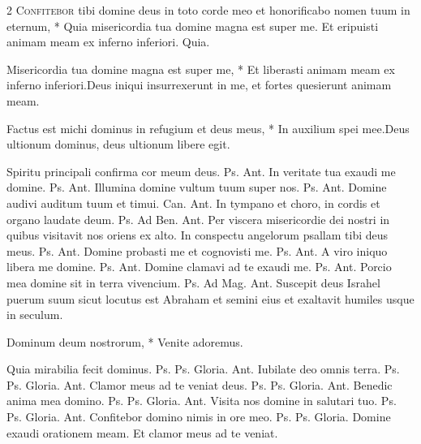 \begin{multicols*}{2}
\lettrine[lines=2]{\zallmancaps \color{Red} C}{onfitebor} \hypertarget{confitebor-tibi}{\label{confitebor-tibi}} tibi domine deus in toto corde meo et honorificabo nomen tuum in eternum, * Quia misericordia tua domine magna est super me. \V Et eripuisti animam meam ex inferno inferiori. Quia.
\begin{responsory}
{Misericordia tua domine magna est super me, * Et liberasti animam meam ex inferno inferiori.}{Deus iniqui insurrexerunt in me, et fortes quesierunt animam meam.}
\end{responsory}%
\begin{responsory-doxology}
{Factus est michi dominus in refugium et deus meus, * In auxilium spei mee.}{Deus ultionum dominus, deus ultionum libere egit.}
\end{responsory-doxology}%
 Spiritu principali confirma cor meum deus. {\color{Red} Ps.}  {\color{Red} Ant.} In veritate tua exaudi me domine. {\color{Red} Ps.}  {\color{Red} Ant.} Illumina domine vultum tuum super nos. {\color{Red} Ps.}  {\color{Red} Ant.} Domine audivi auditum tuum et timui. {\color{Red} Can.}  {\color{Red} Ant.} In tympano et choro, in cordis et organo laudate deum. {\color{Red} Ps.}  {\color{Red} Ad Ben. Ant.} Per viscera misericordie dei nostri in quibus visitavit nos oriens ex alto.
 In conspectu angelorum psallam tibi deus meus. {\color{Red} Ps.}  {\color{Red} Ant.} Domine probasti me et cognovisti me. {\color{Red} Ps.}  {\color{Red} Ant.} A viro iniquo libera me domine. {\color{Red} Ps.}  {\color{Red} Ant.} Domine clamavi ad te exaudi me. {\color{Red} Ps.}  {\color{Red} Ant.} Porcio mea domine sit in terra vivencium. {\color{Red} Ps.}  {\color{Red} Ad Mag. Ant.} Suscepit deus Israhel puerum suum sicut locutus est Abraham et semini eius et exaltavit humiles usque in seculum.
{\color{Red} }
\par {}
\begin{invitatory}
{Dominum deum nostrorum, * Venite adoremus.}
\end{invitatory}
 Quia mirabilia fecit dominus. {\color{Red} Ps.}  {\color{Red} Ps.}  Gloria. {\color{Red} Ant.} Iubilate deo omnis terra. {\color{Red} Ps.}  {\color{Red} Ps.}  Gloria. {\color{Red} Ant.} Clamor meus ad te veniat deus. {\color{Red} Ps.}  {\color{Red} Ps.}  Gloria. {\color{Red} Ant.} Benedic anima mea domino. {\color{Red} Ps.}  {\color{Red} Ps.}  Gloria. {\color{Red} Ant.} Visita nos domine in salutari tuo. {\color{Red} Ps.}  {\color{Red} Ps.}  Gloria. {\color{Red} Ant.} Confitebor domino nimis in ore meo. {\color{Red} Ps.}  {\color{Red} Ps.}  Gloria. \V Domine exaudi orationem meam. \R Et clamor meus ad te veniat. \R

\end{multicols*}

